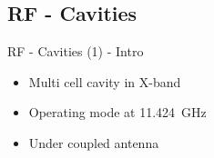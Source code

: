 \documentclass{beamer}
\begin{document}
\subsection{RF - Cavities}
\begin{frame}[t,fragile]{RF - Cavities (1) - Intro}
\begin{itemize}
\item Multi cell cavity in X-band
\item Operating mode at \SI{11.424}{\GHz}
\item Under coupled antenna
\end{itemize}

\begin{figure}
  \centering\setcounter{subfigure}{0}
  \quad
  \\
\end{figure}

\end{frame}
\end{document}
